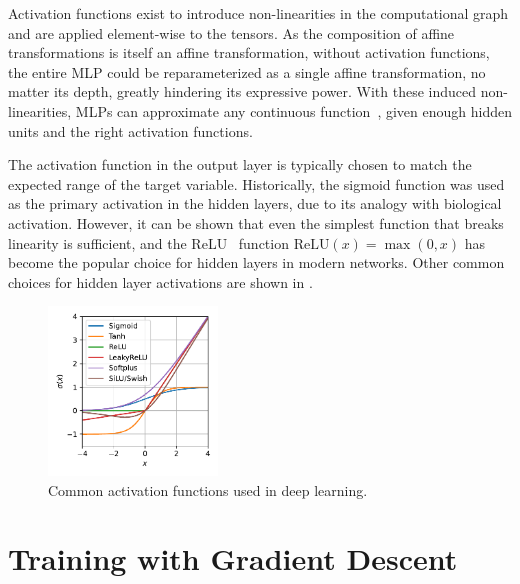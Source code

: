 Activation functions exist to introduce non-linearities in the computational graph and are applied element-wise to the tensors.
As the composition of affine transformations is itself an affine transformation, without activation functions, the entire MLP could be reparameterized as a single affine transformation, no matter its depth, greatly hindering its expressive power.
With these induced non-linearities, MLPs can approximate any continuous function~\cite{ApproximationSuperpositionsSigmoidal, ApproximatingContinuousFunctions, UniversalApproximationDeep}, given enough hidden units and the right activation functions.

The activation function in the output layer is typically chosen to match the expected range of the target variable.
Historically, the sigmoid function was used as the primary activation in the hidden layers, due to its analogy with biological activation.
However, it can be shown that even the simplest function that breaks linearity is sufficient, and the ReLU~\cite{ReLU} function $\text{ReLU}(x) = \max(0, x)$ has become the popular choice for hidden layers in modern networks.
Other common choices for hidden layer activations are shown in .

\begin{figure}
    \centering
    \includegraphics[width=0.4\textwidth]{Figures/transformers/activations.pdf}
    \caption{Common activation functions used in deep learning.}
    \label{fig:activations}
\end{figure}

\section{Training with Gradient Descent}

